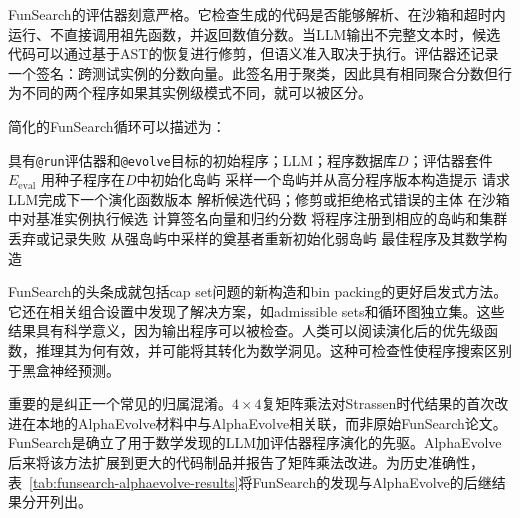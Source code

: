 FunSearch的评估器刻意严格。它检查生成的代码是否能够解析、在沙箱和超时内运行、不直接调用祖先函数，并返回数值分数。当LLM输出不完整文本时，候选代码可以通过基于AST的恢复进行修剪，但语义准入取决于执行。评估器还记录一个签名：跨测试实例的分数向量。此签名用于聚类，因此具有相同聚合分数但行为不同的两个程序如果其实例级模式不同，就可以被区分。

简化的FunSearch循环可以描述为：
\begin{algorithm}[t]
\caption{FunSearch风格程序演化}
\label{alg:funsearch-style}
\begin{algorithmic}[1]
\REQUIRE 具有\texttt{@run}评估器和\texttt{@evolve}目标的初始程序；LLM；程序数据库$D$；评估器套件$E_{\mathrm{eval}}$
\STATE 用种子程序在$D$中初始化岛屿
  \STATE 采样一个岛屿并从高分程序版本构造提示
  \STATE 请求LLM完成下一个演化函数版本
  \STATE 解析候选代码；修剪或拒绝格式错误的主体
  \STATE 在沙箱中对基准实例执行候选
    \STATE 计算签名向量和归约分数
    \STATE 将程序注册到相应的岛屿和集群
  \ELSE
    \STATE 丢弃或记录失败
  \ENDIF
    \STATE 从强岛屿中采样的奠基者重新初始化弱岛屿
  \ENDIF
\ENDWHILE
\RETURN 最佳程序及其数学构造
\end{algorithmic}
\end{algorithm}

FunSearch的头条成就包括cap set问题的新构造和bin packing的更好启发式方法。它还在相关组合设置中发现了解决方案，如admissible sets和循环图独立集。这些结果具有科学意义，因为输出程序可以被检查。人类可以阅读演化后的优先级函数，推理其为何有效，并可能将其转化为数学洞见。这种可检查性使程序搜索区别于黑盒神经预测。

重要的是纠正一个常见的归属混淆。$4\times4$复矩阵乘法对Strassen时代结果的首次改进在本地的AlphaEvolve材料中与AlphaEvolve相关联，而非原始FunSearch论文。FunSearch是确立了用于数学发现的LLM加评估器程序演化的先驱。AlphaEvolve后来将该方法扩展到更大的代码制品并报告了矩阵乘法改进。为历史准确性，表~\ref{tab:funsearch-alphaevolve-results}将FunSearch的发现与AlphaEvolve的后继结果分开列出。

